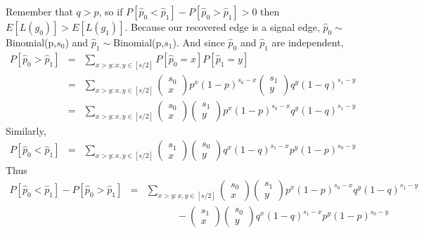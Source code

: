 \documentclass{article}
\begin{document}
Remember that $q>p$, so if $P[\hat{p}_0<\hat{p}_1] - P[\hat{p}_0>\hat{p}_1] > 0$ then $E[L(g_0)]>E[L(g_1)]$. Because our recovered edge is a signal edge, $\hat{p}_0\sim$Binomial(p,$s_0$) and $\hat{p}_1\sim$Binomial(p,$s_1$). And since $\hat{p}_0$ and $\hat{p}_1$ are independent,
\begin{eqnarray}
P[\hat{p}_0>\hat{p}_1]
&=& \sum_{x>y:x,y\in[s/2]}P[\hat{p}_0=x]P[\hat{p}_1=y]
\\
&=& \sum_{x>y:x,y\in[s/2]}\left(\begin{matrix}s_0\\x\end{matrix}\right)p^x(1-p)^{s_0-x}
                          \left(\begin{matrix}s_1\\y\end{matrix}\right)q^y(1-q)^{s_1-y}
\\
&=& \sum_{x>y:x,y\in[s/2]}\left(\begin{matrix}s_0\\x\end{matrix}\right)
                          \left(\begin{matrix}s_1\\y\end{matrix}\right)p^x(1-p)^{s_0-x}q^y(1-q)^{s_1-y}
\end{eqnarray}
Similarly,
\begin{eqnarray}
P[\hat{p}_0<\hat{p}_1]
&=& \sum_{x>y:x,y\in[s/2]}\left(\begin{matrix}s_1\\x\end{matrix}\right)
                          \left(\begin{matrix}s_0\\y\end{matrix}\right)q^x(1-q)^{s_1-x}p^y(1-p)^{s_0-y}
\end{eqnarray}
Thus
\begin{eqnarray}
P[\hat{p}_0<\hat{p}_1] - P[\hat{p}_0>\hat{p}_1]
&=& \sum_{x>y:x,y\in[s/2]}\left(\begin{matrix}s_0\\x\end{matrix}\right)
                          \left(\begin{matrix}s_1\\y\end{matrix}\right)p^x(1-p)^{s_0-x}q^y(1-q)^{s_1-y}
\\&&\ \ \ \ \ \ \ \ \ \ \ \ \ \  -\left(\begin{matrix}s_1\\x\end{matrix}\right)
                          \left(\begin{matrix}s_0\\y\end{matrix}\right)q^x(1-q)^{s_1-x}p^y(1-p)^{s_0-y}
\end{eqnarray}
\end{document}
